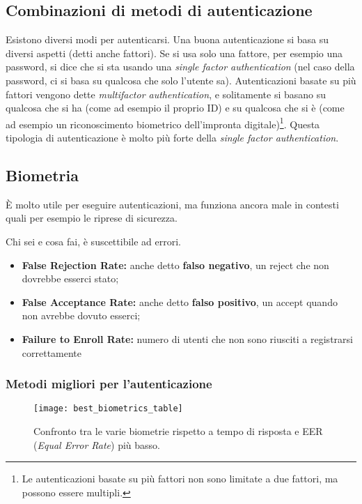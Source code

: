 \subsection{Combinazioni di metodi di autenticazione}

Esistono diversi modi per autenticarsi. Una buona autenticazione si basa su
diversi aspetti (detti anche fattori). Se si usa solo una fattore, per esempio
una password, si dice che si sta usando una \textit{single factor
authentication} (nel caso della password, ci si basa su qualcosa che solo
l'utente sa). Autenticazioni basate su più fattori vengono dette
\textit{multifactor authentication}, e solitamente si basano su qualcosa che si
ha (come ad esempio il proprio ID) e su qualcosa che si è (come ad esempio un
riconoscimento biometrico dell'impronta digitale)\footnote{Le autenticazioni
basate su più fattori non sono limitate a due fattori, ma
possono essere multipli.}. Questa tipologia di autenticazione è molto più
forte della \textit{single factor authentication}.

\subsection{Biometria}

È molto utile per eseguire autenticazioni, ma funziona ancora male in contesti
quali per esempio le riprese di sicurezza.

Chi sei e cosa fai, è suscettibile ad errori.

\begin{itemize}
\item \textbf{False Rejection Rate:} anche detto \textbf{falso negativo}, un reject che
non dovrebbe esserci stato;
\item \textbf{False Acceptance Rate:} anche detto \textbf{falso positivo}, un accept
quando non avrebbe dovuto esserci;
\item \textbf{Failure to Enroll Rate:} numero di utenti che non sono riusciti a
registrarsi correttamente
\end{itemize}

\subsubsection{Metodi migliori per l'autenticazione}

\begin{figure}[H]
 \centering
 \texttt{[image: best\_biometrics\_table]}
 \caption{Confronto tra le varie biometrie rispetto a tempo di risposta e EER
(\emph{Equal Error Rate}) più basso. }
\end{figure}


